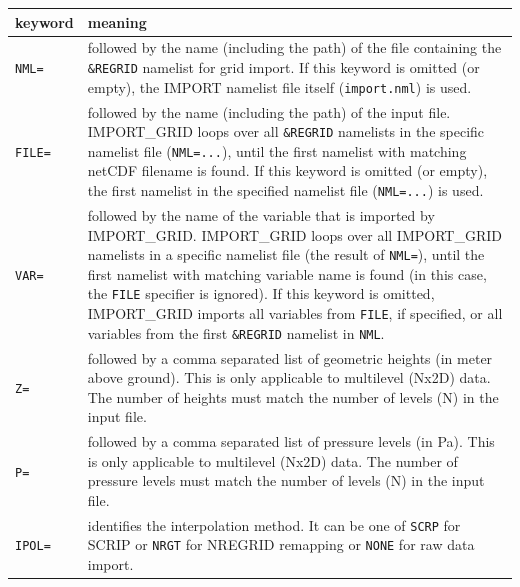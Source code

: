 \documentclass[11pt,twoside]{report}
\begin{document}
\begin{tabular}{lp{14.9cm}} \hline
keyword & meaning \\ \hline
 \verb|NML=| & followed by the name (including the path) of
the file containing the \verb|&REGRID| namelist for grid import. 
If this keyword is omitted (or empty), 
the IMPORT namelist file itself (\verb|import.nml|) is used. \\
  \verb|FILE=|  & followed by the name (including the path) of the
 input file. IMPORT\_GRID loops over  
all \verb|&REGRID| namelists in the specific namelist file
 (\verb|NML=...|), until the first  
namelist with matching netCDF filename is found. If this keyword is omitted (or empty), the first
 namelist in the specified namelist file (\verb|NML=...|) is used. \\
 \verb|VAR=| & followed by the name of the variable that is imported by IMPORT\_GRID. 
IMPORT\_GRID loops over all IMPORT\_GRID namelists in a specific namelist file 
(the result of \verb|NML=|), until the first namelist with matching variable name is found (in this 
case, the \verb|FILE| specifier is ignored). If this keyword is omitted, IMPORT\_GRID imports all 
variables from \verb|FILE|, if specified, or all variables from the first \verb|&REGRID| namelist in \verb|NML|.\\
\verb|Z=| & followed by a comma separated list of geometric
heights (in meter above ground). This is only applicable to  multilevel 
(Nx2D) data. The number of heights must match the number
of levels (N) in the input file. \\
\verb|P=| & followed by a comma separated list of pressure levels (in Pa). 
This is only applicable to  multilevel (Nx2D) data. The number of pressure
levels must match the number of levels (N) in the input file. \\

\verb|IPOL=|  & identifies the interpolation method. It can be one of
\verb|SCRP| for SCRIP or \verb|NRGT| for NREGRID remapping
 or \verb|NONE| for raw data import.\\ \hline
\end{tabular}



\end{document}
